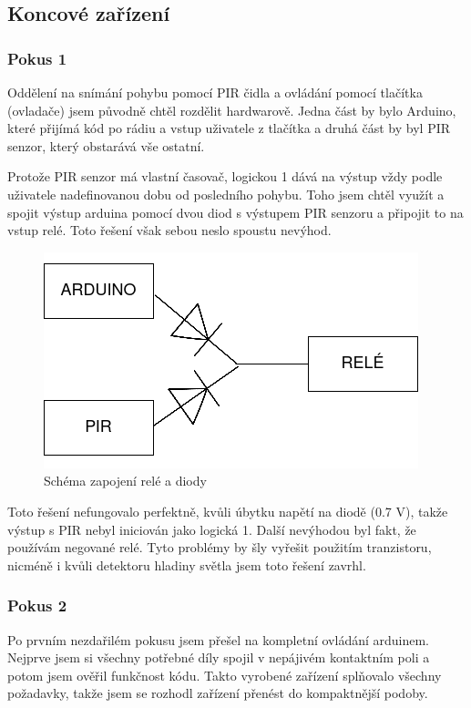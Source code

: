 \documentclass[11pt,a4paper,twoside,openright]{report}
\begin{document}
	\subsection{Koncové zařízení}
	
	\subsubsection{Pokus 1}
	
	Oddělení na snímání pohybu pomocí PIR čidla a ovládání pomocí tlačítka (ovladače) jsem původně chtěl rozdělit hardwarově. Jedna část by bylo Arduino, které přijímá kód po rádiu a vstup uživatele z tlačítka a druhá část by byl PIR senzor, který obstarává vše ostatní.
	
	
	Protože PIR senzor má vlastní časovač, logickou 1 dává na výstup vždy podle uživatele nadefinovanou dobu od posledního pohybu. Toho jsem chtěl využít a spojit výstup arduina pomocí dvou diod s výstupem PIR senzoru a připojit to na vstup relé. Toto řešení však sebou neslo spoustu nevýhod. 
	
	\begin{figure}[htb]
		\centering
		\includegraphics[width=0.5\hsize]{img/zapojeni_rele.png}
		\caption{Schéma zapojení relé a diody}\end{figure}
	
	Toto řešení nefungovalo perfektně, kvůli úbytku napětí na diodě (0.7 V), takže výstup s PIR nebyl iniciován jako logická 1. Další nevýhodou byl fakt, že používám negované relé. Tyto problémy by šly vyřešit použitím tranzistoru, nicméně i kvůli detektoru hladiny světla jsem toto řešení zavrhl.
	
	\subsubsection{Pokus 2}
	
	Po prvním nezdařilém pokusu jsem přešel na kompletní ovládání arduinem. Nejprve jsem si všechny potřebné díly spojil v nepájivém kontaktním poli a potom jsem ověřil funkčnost kódu. Takto vyrobené zařízení splňovalo všechny požadavky, takže jsem se rozhodl zařízení přenést do kompaktnější podoby.
	
\end{document}
